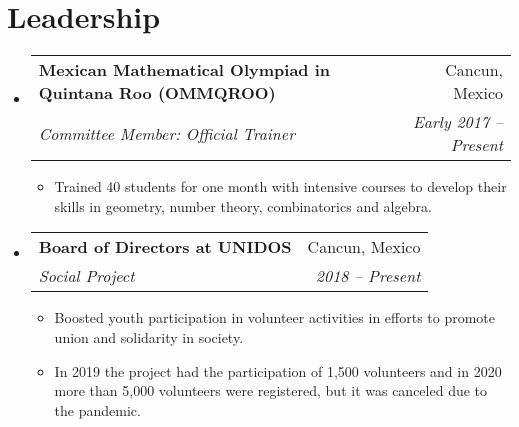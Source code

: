 \documentclass[letterpaper,11pt]{article}
\makeatletter
\newcommand{\resumeItem}[1]{
  \item\small{
    {#1 \vspace{-2pt}}
  }
}
\newcommand{\resumeSubheading}[4]{
  \vspace{-2pt}\item
    \begin{tabular*}{0.97\textwidth}[t]{l@{\extracolsep{\fill}}r}
      \textbf{#1} & #2 \\
      \textit{\small#3} & \textit{\small #4} \\
    \end{tabular*}\vspace{-7pt}
}
\newcommand{\resumeSubHeadingListStart}{\begin{itemize}[leftmargin=0.15in, label={}]}
\newcommand{\resumeSubHeadingListEnd}{\end{itemize}}
\newcommand{\resumeItemListStart}{\begin{itemize}}
\newcommand{\resumeItemListEnd}{\end{itemize}\vspace{-5pt}}
\makeatother
\begin{document}
\section{Leadership}
\resumeSubHeadingListStart
    \resumeSubheading
      {Mexican Mathematical Olympiad in Quintana Roo (OMMQROO) }{Cancun, Mexico}
      {Committee Member: Official Trainer}{Early 2017 -- Present}
      \resumeItemListStart
        \resumeItem{Trained 40 students for one month with intensive courses to develop their skills in geometry, number theory, combinatorics and algebra.}
      \resumeItemListEnd
    \resumeSubheading
      {Board of Directors at UNIDOS}{Cancun, Mexico}
      {Social Project}{2018 -- Present}
      \resumeItemListStart
        \resumeItem{Boosted youth participation in volunteer activities in efforts to promote union and solidarity in society.}
    \resumeItem{In 2019 the project had the participation of 1,500 volunteers and in 2020 more than 5,000 volunteers were registered, but it was canceled due to the pandemic.}
      \resumeItemListEnd
    \resumeSubHeadingListEnd
\end{document}
